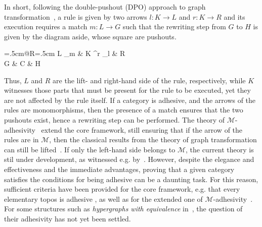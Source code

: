 \documentclass[a4paper,UKenglish,cleveref,pdftex,thm-restate,numberwithinsect]{lipics-v2021}
\begin{document}
\vspace{.1cm}
\noindent
\begin{minipage}[l]{.78\linewidth}In short, following the double-pushout (DPO) approach
to graph transformation~\cite{xxx}, a rule is given by two arrows $l: K \to L$ and $r: K \rightarrow R$
and its execution requires a match $m: L \to G$ such that the rewriting step from $G$
to $H$ is given by the diagram aside, whose square are pushouts.
  \end{minipage}%
    \hfill
  \begin{minipage}[r]{.20\linewidth }
    \xymatrix@C=.5cm@R=.5cm{
      L \ar[d]_{m}
      & K \ar[r]^r \ar[l]_{l} \ar[d] & R \ar [d] \\
      G & C \ar[r] \ar[l]                    & H
    }
  \end{minipage}
\vspace{.1cm}

\noindent
Thus, $L$ and $R$ are the lift- and right-hand side of the rule, respectively, while $K$ witnesses those parts that must 
be present for the rule to be executed, yet they are not affected by the rule itself.
%
If a category is adhesive, and the arrows of the rules are monomorphisms, then the presence of a match ensures that the
two pushouts exist, hence a rewriting step can be performed.
%
The theory of $\mathcal{M}$-adhesivity~\cite{xxx} extend the core framework, still ensuring that if the arrow 
of the rules are in $\mathcal{M}$,
then the classical results from the theory of graph 
transformation can still be lifted~\cite{xxx}. 
If only the left-hand side belongs to $\mathcal{M}$, the current theory is stil under development, as witnessed e.g.
by~\cite{BaldanC0G24}.
%
However, despite the elegance and effectiveness and the immediate advantages, 
proving that a given category satisfies the conditions 
for being adhesive can be a daunting task. For this reason,  sufficient criteria have been provided for the core 
framework, e.g. that every elementary topos is adhesive \cite{lack2006toposes}, as well as for the extended one of
$\mathcal{M}$-adhesivity~\cite{CastelnovoGM24}.
%
For some structures such as \emph{hypergraphs with equivalence} in~\cite{concur2006}, the question 
of their adhesivity has not yet been settled.
\end{document}
